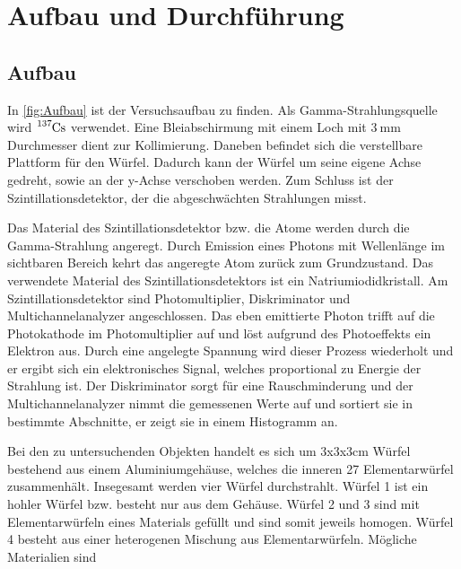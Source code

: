 \section{Aufbau und Durchführung}
\label{sec:Durchführung}

\subsection{Aufbau}
In \autoref{fig:Aufbau} ist der Versuchsaufbau zu finden.
Als Gamma-Strahlungsquelle wird $\ce{^{137}Cs}$ verwendet.
Eine Bleiabschirmung mit einem Loch mit $\SI{3}{\milli\metre}$ Durchmesser dient zur Kollimierung.
Daneben befindet sich die verstellbare Plattform für den Würfel.
Dadurch kann der Würfel um seine eigene Achse gedreht, sowie an der y-Achse verschoben werden.
Zum Schluss ist der Szintillationsdetektor, der die abgeschwächten Strahlungen misst.

\noindent
Das Material des Szintillationsdetektor bzw. die Atome werden durch die Gamma-Strahlung angeregt.
Durch Emission eines Photons mit Wellenlänge im sichtbaren Bereich kehrt das angeregte Atom zurück zum Grundzustand.
Das verwendete Material des Szintillationsdetektors ist ein Natriumiodidkristall.
Am Szintillationsdetektor sind Photomultiplier, Diskriminator und Multichannelanalyzer angeschlossen.
Das eben emittierte Photon trifft auf die Photokathode im Photomultiplier auf und löst aufgrund des Photoeffekts ein Elektron aus.
Durch eine angelegte Spannung wird dieser Prozess wiederholt und er ergibt sich ein elektronisches Signal, welches proportional zu Energie der Strahlung ist.
Der Diskriminator sorgt für eine Rauschminderung und der Multichannelanalyzer nimmt die gemessenen Werte auf und sortiert sie in bestimmte Abschnitte, er zeigt sie in einem Histogramm an.

\noindent
Bei den zu untersuchenden Objekten handelt es sich um 3x3x3cm Würfel bestehend aus einem Aluminiumgehäuse, welches die inneren 27 Elementarwürfel zusammenhält.
Insegesamt werden vier Würfel durchstrahlt.
Würfel 1 ist ein hohler Würfel bzw. besteht nur aus dem Gehäuse.
Würfel 2 und 3 sind mit Elementarwürfeln eines Materials gefüllt und sind somit jeweils homogen.
Würfel 4 besteht aus einer heterogenen Mischung aus Elementarwürfeln.
Mögliche Materialien sind 


